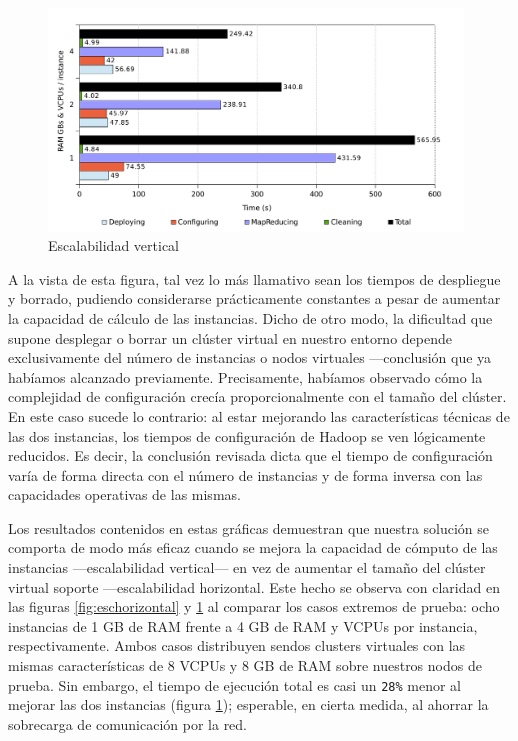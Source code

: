 \begin{figure}[tbp]
\begin{center}
\includegraphics[width=0.98\textwidth]{imagenes/041.pdf}
\caption{Escalabilidad vertical}
\label{fig:escvertical}
\end{center}
\end{figure}

A la vista de esta figura, tal vez lo m\'as llamativo sean los tiempos de des\-plie\-gue y borrado, pudiendo considerarse pr\'acticamente constantes a pesar de aumentar la capacidad de c\'alculo de las instancias. Dicho de otro modo, la dificultad que supone desplegar o borrar un cl\'uster virtual en nuestro entorno depende exclusivamente del n\'umero de instancias o nodos virtuales ---conclusi\'on que ya hab\'iamos alcanzado previamente. Precisamente, hab\'iamos observado c\'omo la complejidad de configuraci\'on crec\'ia proporcionalmente con el tama\~no del cl\'uster. En este caso sucede lo contrario: al estar mejorando las caracter\'isticas t\'ecnicas de las dos instancias, los tiempos de configuraci\'on de Hadoop se ven l\'ogicamente reducidos. Es decir, la conclusi\'on revisada dicta que el tiempo de configuraci\'on var\'ia de forma directa con el n\'umero de instancias y de forma inversa con las capacidades operativas de las mismas. \newline

Los resultados contenidos en estas gr\'aficas demuestran que nuestra soluci\'on se comporta de modo m\'as eficaz cuando se mejora la capacidad de c\'omputo de las instancias ---escalabilidad vertical--- en vez de aumentar el tama\~no del cl\'uster virtual soporte ---escalabilidad horizontal. Este hecho se observa con claridad en las figuras \ref{fig:eschorizontal} y \ref{fig:escvertical} al comparar los casos extremos de prueba: ocho instancias de 1 GB de RAM frente a 4 GB de RAM y VCPUs por ins\-tan\-cia, respectivamente. Ambos casos distribuyen sendos clusters virtuales con las mismas caracter\'isticas de 8 VCPUs y 8 GB de RAM sobre nuestros nodos de prueba. Sin embargo, el tiempo de ejecuci\'on total es casi un \texttt{28\%} menor al mejorar las dos instancias (figura \ref{fig:escvertical}); esperable, en cierta medida, al ahorrar la sobrecarga de comunicaci\'on por la red. \newline


